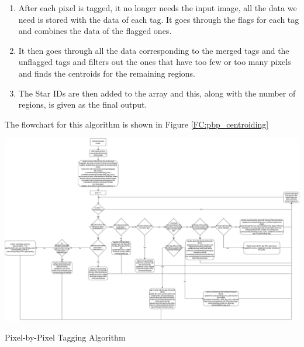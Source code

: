 \begin{enumerate}
\begin{enumerate}
\begin{enumerate}
        \end{enumerate}
        \item If only one of them is bright, the pixel is tagged with the corresponding tag and the data is added to the data of that tag
        \item If none of them are bright, it checks the pixel to the right and the one to the right of the one to the north\footnote{This is done to reduce the unnecessary creation of new tags and the resulting conflicts between tags that will eventually get connected at some pixel. The testing done so far has suggested that this is fairly effective in cutting down on the use of flags and the resulting merge.}.
            \begin{itemize}
                \item If both of those are bright, the pixel is tagged with the tag of the pixel to the right of the one to the north. 
                \item If not, the pixel is assigned a new tag and the data is added to the corresponding tag's data
            \end{itemize}
    \end{enumerate}
    \item After each pixel is tagged, it no longer needs the input image, all the data we need is stored with the data of each tag. It goes through the flags for each tag and combines the data of the flagged ones. 
    \item It then goes through all the data corresponding to the merged tags and the unflagged tags and filters out the ones that have too few or too many pixels and finds the centroids for the remaining regions.
    \item The Star IDs are then added to the array and this, along with the number of regions, is given as the final output.
\end{enumerate}
The flowchart for this algorithm is shown in Figure \ref{FC:pbp_centroiding}
\newpage
\begin{Flowchart}
    \centering
    \includegraphics[width=\textwidth]{Figures/Electrical/centroiding_2.png}
    \caption{Pixel-by-Pixel Tagging Algorithm}
    \label{FC:pbp_centroiding}
\end{Flowchart}